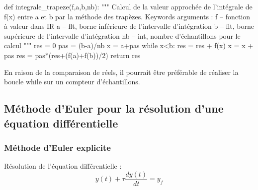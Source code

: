 \documentclass[10pt]{article}
\begin{document}
\begin{py}
\begin{python}
def integrale_trapeze(f,a,b,nb):
    """
    Calcul de la valeur approchée de l'intégrale de f(x) entre a et b par la méthode des trapèzes.
    Keywords arguments :
    f -- fonction à valeur dans IR
    a -- flt, borne inférieure de l'intervalle d'intégration
    b -- flt, borne supérieure de l'intervalle d'intégration
    nb -- int, nombre d'échantillons pour le calcul
    """
    res = 0
    pas = (b-a)/nb
    x = a+pas
    while x<b:
        res = res + f(x)
        x = x + pas
    res = pas*(res+(f(a)+f(b))/2)
    return res
\end{python}
\end{py}

\begin{rem}
En raison de la comparaison de réels,  il pourrait être préférable de réaliser la boucle \textsf{while} sur un compteur d'échantillons.
\end{rem}

\subsection{Méthode d'Euler pour la résolution d'une équation différentielle}

\subsubsection{Méthode d'Euler explicite}
Résolution de l'équation différentielle :
$$
y(t) + \tau\dfrac{dy(t)}{dt} = y_f
$$
\end{document}
